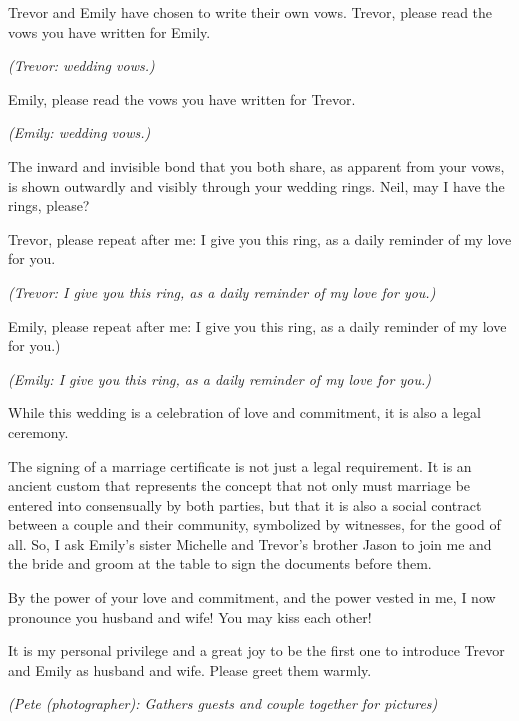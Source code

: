 \documentclass[12pt]{article}
\begin{document}
Trevor and Emily have chosen to write their own vows. Trevor, please
read the vows you have written for Emily. \par

\textsl{(Trevor: wedding vows.)} \par

Emily, please read the vows you have written for Trevor. \par

\textsl{(Emily: wedding vows.)} \par

The inward and invisible bond that you both share, as apparent from
your vows, is shown outwardly and visibly through your wedding
rings. Neil, may I have the rings, please? \par

Trevor, please repeat after me: I give you this ring, as a daily
reminder of my love for you. \par

\textsl{(Trevor: I give you this ring, as a daily reminder of my love
  for you.)} \par

Emily, please repeat after me: I give you this ring, as a daily
reminder of my love for you.) \par

\textsl{(Emily: I give you this ring, as a daily reminder of my love
  for you.)} \par

While this wedding is a celebration of love and commitment, it is also
a legal ceremony. \par

The signing of a marriage certificate is not just a legal
requirement. It is an ancient custom that represents the concept that
not only must marriage be entered into consensually by both parties,
but that it is also a social contract between a couple and their
community, symbolized by witnesses, for the good of all. So, I ask
Emily's sister Michelle and Trevor's brother Jason to join me and the
bride and groom at the table to sign the documents before them.

By the power of your love and commitment, and the power vested in me,
I now pronounce you husband and wife! You may kiss each other! \par

It is my personal privilege and a great joy to be the first one to
introduce Trevor and Emily as husband and wife. Please greet them
warmly. \par

\textsl{(Pete (photographer): \textsl{Gathers guests and couple
    together for pictures})}
\end{document}
